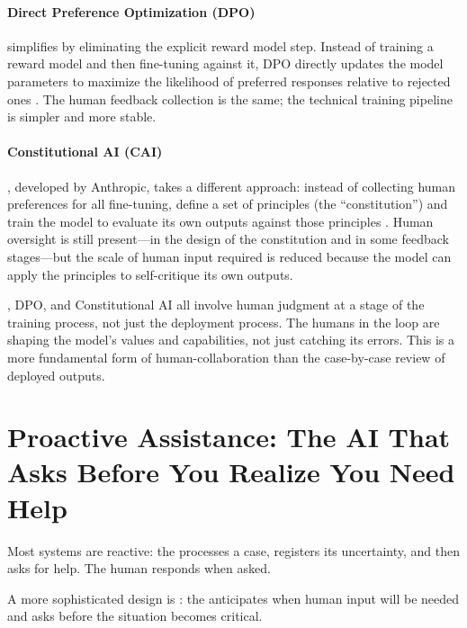 \paragraph{Direct Preference Optimization (DPO)} simplifies \rlhf by eliminating the explicit reward model step. Instead of training a reward model and then fine-tuning against it, DPO directly updates the model parameters to maximize the likelihood of preferred responses relative to rejected ones \autocite{rafailov2023direct}. The human feedback collection is the same; the technical training pipeline is simpler and more stable.

\paragraph{Constitutional AI (CAI)}, developed by Anthropic, takes a different approach: instead of collecting human preferences for all fine-tuning, define a set of principles (the ``constitution'') and train the model to evaluate its own outputs against those principles \autocite{bai2022constitutional}. Human oversight is still present---in the design of the constitution and in some feedback stages---but the scale of human input required is reduced because the model can apply the principles to self-critique its own outputs.

\begin{technote}
\rlhf, DPO, and Constitutional AI all involve human judgment at a stage of the training process, not just the deployment process. The humans in the loop are shaping the model's values and capabilities, not just catching its errors. This is a more fundamental form of human-\ai collaboration than the case-by-case review of deployed outputs.
\end{technote}

\section{Proactive Assistance: The AI That Asks Before You Realize You Need Help}
\label{sec:ch17-proactive}

Most \hitl systems are reactive: the \ai processes a case, registers its uncertainty, and then asks for help. The human responds when asked.

A more sophisticated design is : the \ai anticipates when human input will be needed and asks before the situation becomes critical.

